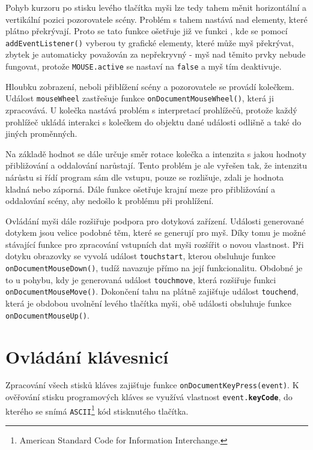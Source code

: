 Pohyb kurzoru po stisku levého tlačítka myši lze tedy tahem měnit horizontální a vertikální pozici pozorovatele scény. Problém s tahem nastává nad elementy, které plátno překrývají. Proto se tato funkce ošetřuje již ve funkci \texttt{\initProgram}, kde se pomocí \\\texttt{addEventListener()} vyberou ty grafické elementy, které může myš překrývat, zbytek je automaticky považován za nepřekryvný - myš nad těmito prvky nebude fungovat, protože \texttt{MOUSE.active} se nastaví na  \texttt{false} a myš tím deaktivuje.


Hloubku zobrazení, neboli přiblížení scény a pozorovatele se provádí kolečkem. Událost \texttt{mouseWheel} zastřešuje funkce \texttt{onDocumentMouseWheel()}, která ji zpracovává. U kolečka nastává problém s interpretací prohlížečů, protože každý prohlížeč ukládá interakci s kolečkem do objektu dané události odlišně a také do jiných proměnných. 


Na základě hodnot se dále určuje směr rotace kolečka a intenzita s jakou hodnoty přibližování a oddalování narůstají. Tento problém je ale vyřešen tak, že intenzitu nárůstu si řídí program sám dle vstupu, pouze se rozlišuje, zdali je hodnota kladná nebo záporná.
Dále funkce ošetřuje krajní meze pro přibližování a oddalování scény, aby nedošlo k problému při prohlížení.
 

Ovládání myši dále rozšiřuje podpora pro dotyková zařízení. Události generované dotykem jsou velice podobné těm, které se generují pro myš. Díky tomu je možné stávající funkce pro zpracování vstupních dat myši rozšířit o novou vlastnost. Při dotyku obrazovky se vyvolá událost \texttt{touchstart}, kterou obsluhuje funkce \texttt{onDocumentMouseDown()}, tudíž navazuje přímo na její funkcionalitu. Obdobné je to u pohybu, kdy je generovaná událost \texttt{touchmove}, která rozšiřuje funkci \texttt{onDocumentMouseMove()}. Dokončení tahu na plátně zajišťuje událost \texttt{touchend}, která je obdobou uvolnění levého tlačítka myši, obě události obsluhuje funkce \texttt{onDocumentMouseUp()}. 


\section{Ovládání klávesnicí}
Zpracování všech stisků kláves zajišťuje funkce \texttt{onDocumentKeyPress(event)}. K ověřování stisku programových kláves se využívá vlastnost \texttt{event.\textbf{keyCode}}, do kterého se snímá \texttt{ASCII}\footnote{American Standard Code for Information Interchange.} kód stisknutého tlačítka.

